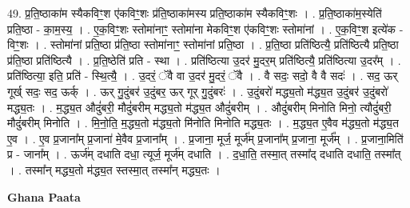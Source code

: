 \documentclass[17pt]{extarticle}
\begin{document}
49. प्र॒ति॒ष्ठाका॑म स्यैकविꣳ॒॒श ए॑कविꣳ॒॒शः प्र॑ति॒ष्ठाका॑मस्य प्रति॒ष्ठाका॑म स्यैकविꣳ॒॒शः । . प्र॒ति॒ष्ठाका॑म॒स्येति॑ प्रति॒ष्ठा - का॒म॒स्य॒ । . ए॒क॒विꣳ॒॒शः स्तोमा॑नाꣳ॒॒ स्तोमा॑ना मेकविꣳ॒॒श ए॑कविꣳ॒॒शः स्तोमा॑नां । . ए॒क॒विꣳ॒॒श इत्ये॑क - विꣳ॒॒शः । . स्तोमा॑नां प्रति॒ष्ठा प्र॑ति॒ष्ठा स्तोमा॑नाꣳ॒॒ स्तोमा॑नां प्रति॒ष्ठा । . प्र॒ति॒ष्ठा प्रति॑ष्ठित्यै॒ प्रति॑ष्ठित्यै प्रति॒ष्ठा प्र॑ति॒ष्ठा प्रति॑ष्ठित्यै । . प्र॒ति॒ष्ठेति॑ प्रति - स्था । . प्रति॑ष्ठित्या उ॒दर॑ मु॒दर॒म् प्रति॑ष्ठित्यै॒ प्रति॑ष्ठित्या उ॒दर᳚म् । . प्रति॑ष्ठित्या॒ इति॒ प्रति॑ - स्थि॒त्यै॒ । . उ॒दरं॒ ॅवै वा उ॒दर॑ मु॒दरं॒ ॅवै । . वै सदः॒ सदो॒ वै वै सदः॑ । . सद॒ ऊर् गूर्ख् सदः॒ सद॒ ऊर्क् । . ऊर् गु॒दुंबर॑ उ॒दुंबर॒ ऊर् गूर् गु॒दुंबरः॑ । . उ॒दुंबरो॑ मद्ध्य॒तो म॑द्ध्य॒त उ॒दुंबर॑ उ॒दुंबरो॑ मद्ध्य॒तः । . म॒द्ध्य॒त औदुं॑बरी॒ मौदुं॑बरीम् मद्ध्य॒तो म॑द्ध्य॒त औदुं॑बरीम् । . औदुं॑बरीम् मिनोति मिनो॒ त्यौदुं॑बरी॒ मौदुं॑बरीम् मिनोति । . मि॒नो॒ति॒ म॒द्ध्य॒तो म॑द्ध्य॒तो मि॑नोति मिनोति मद्ध्य॒तः । . म॒द्ध्य॒त ए॒वैव म॑द्ध्य॒तो म॑द्ध्य॒त ए॒व । . ए॒व प्र॒जाना᳚म् प्र॒जाना॑ मे॒वैव प्र॒जाना᳚म् । . प्र॒जाना॒ मूर्ज॒ मूर्ज॑म् प्र॒जाना᳚म् प्र॒जाना॒ मूर्ज᳚म् । . प्र॒जाना॒मिति॑ प्र - जाना᳚म् । . ऊर्ज॑म् दधाति दधा॒ त्यूर्ज॒ मूर्ज॑म् दधाति । . द॒धा॒ति॒ तस्मा॒त् तस्मा᳚द् दधाति दधाति॒ तस्मा᳚त् । . तस्मा᳚न् मद्ध्य॒तो म॑द्ध्य॒त स्तस्मा॒त् तस्मा᳚न् मद्ध्य॒तः । \newline

\textbf{Ghana Paata } \newline
\end{document}
